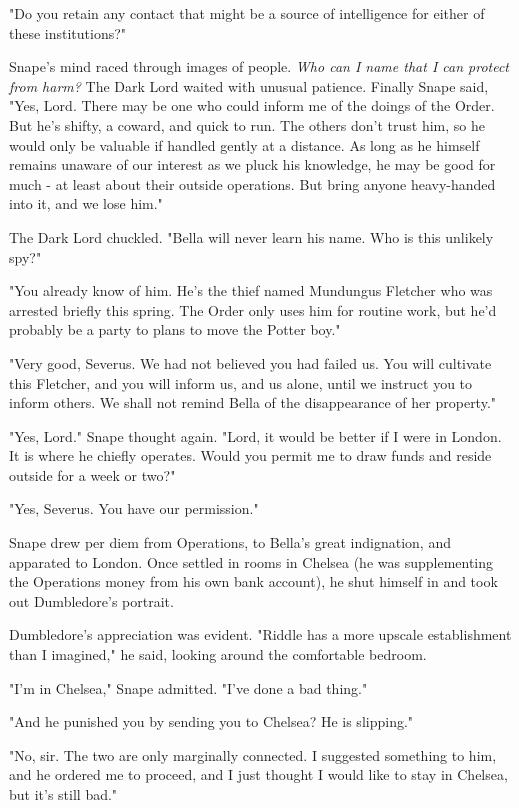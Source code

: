 \documentclass[a4paper,11pt]{article}
\begin{document}
"Do you retain any contact that might be a source of intelligence for either of these institutions?"

Snape's mind raced through images of people. \emph{Who can I name that I can protect from harm?} The Dark Lord waited with unusual patience. Finally Snape said, "Yes, Lord. There may be one who could inform me of the doings of the Order. But he's shifty, a coward, and quick to run. The others don't trust him, so he would only be valuable if handled gently at a distance. As long as he himself remains unaware of our interest as we pluck his knowledge, he may be good for much - at least about their outside operations. But bring anyone heavy-handed into it, and we lose him."

The Dark Lord chuckled. "Bella will never learn his name. Who is this unlikely spy?"

"You already know of him. He's the thief named Mundungus Fletcher who was arrested briefly this spring. The Order only uses him for routine work, but he'd probably be a party to plans to move the Potter boy."

"Very good, Severus. We had not believed you had failed us. You will cultivate this Fletcher, and you will inform us, and us alone, until we instruct you to inform others. We shall not remind Bella of the disappearance of her property."

"Yes, Lord." Snape thought again. "Lord, it would be better if I were in London. It is where he chiefly operates. Would you permit me to draw funds and reside outside for a week or two?"

"Yes, Severus. You have our permission."

Snape drew per diem from Operations, to Bella's great indignation, and apparated to London. Once settled in rooms in Chelsea (he was supplementing the Operations money from his own bank account), he shut himself in and took out Dumbledore's portrait.

Dumbledore's appreciation was evident. "Riddle has a more upscale establishment than I imagined," he said, looking around the comfortable bedroom.

"I'm in Chelsea," Snape admitted. "I've done a bad thing."

"And he punished you by sending you to Chelsea? He is slipping."

"No, sir. The two are only marginally connected. I suggested something to him, and he ordered me to proceed, and I just thought I would like to stay in Chelsea, but it's still bad."
\end{document}
